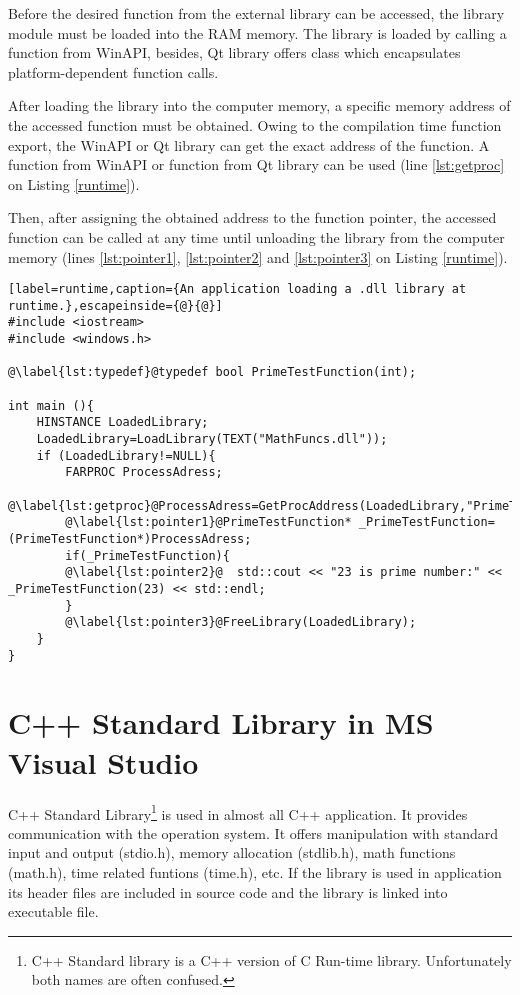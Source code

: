 Before the desired function from the external library can be accessed, the library module must be loaded into the RAM memory. The library is loaded by calling a  function from WinAPI, besides, Qt library offers  class which encapsulates platform-dependent function calls.

After loading the library into the computer memory, a specific memory address of the accessed function must be obtained. Owing to the compilation time function export, the WinAPI or Qt library can get the exact address of the function. A  function from WinAPI or  function from Qt library can be used (line \ref{lst:getproc} on Listing \ref{runtime}).

Then, after assigning the obtained address to the function pointer, the accessed function can be called at any time until unloading the library from the computer memory (lines \ref{lst:pointer1}, \ref{lst:pointer2} and \ref{lst:pointer3} on Listing \ref{runtime}).

\begin{lstlisting}[label=runtime,caption={An application loading a .dll library at runtime.},escapeinside={@}{@}]
#include <iostream>
#include <windows.h>

@\label{lst:typedef}@typedef bool PrimeTestFunction(int);

int main (){
	HINSTANCE LoadedLibrary;
	LoadedLibrary=LoadLibrary(TEXT("MathFuncs.dll"));
	if (LoadedLibrary!=NULL){
		FARPROC ProcessAdress;
		@\label{lst:getproc}@ProcessAdress=GetProcAddress(LoadedLibrary,"PrimeTest");
		@\label{lst:pointer1}@PrimeTestFunction* _PrimeTestFunction=(PrimeTestFunction*)ProcessAdress;
		if(_PrimeTestFunction){
		@\label{lst:pointer2}@	std::cout << "23 is prime number:" << _PrimeTestFunction(23) << std::endl;
		}
		@\label{lst:pointer3}@FreeLibrary(LoadedLibrary);
	}
}
\end{lstlisting}



\section{C++ Standard Library in MS Visual Studio}

\label{standardlibrary}
C++ Standard Library\footnote{C++ Standard library is a C++ version of C Run-time library. Unfortunately both names are often confused.} is used in almost all C++ application. It provides communication with the operation system. It offers manipulation with standard input and output (stdio.h), memory allocation (stdlib.h), math functions (math.h), time related funtions (time.h), etc. If the library is used in application its header files are included in source code and the library is linked into executable file.

